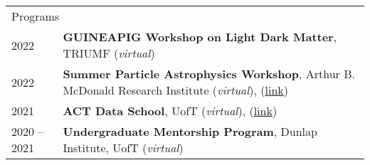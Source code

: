 \documentclass[10pt]{res} %
\begin{document}
\begin{resume}
\begin{table}[h]
\begin{tabularx}{\textwidth}{ @{} p{6.5em} X @{} }
\multicolumn{2}{l}{ \rule{0pt}{3ex} \large \hspace{-12pt} Programs \dotfill \rule[-1.2ex]{0pt}{0pt}} \\
2022 & \textbf{GUINEAPIG Workshop on Light Dark Matter}, TRIUMF (\textit{virtual}) \\
2022 & \textbf{Summer Particle Astrophysics Workshop}, Arthur B. McDonald Research Institute (\textit{virtual}), (\href{https://indico.cern.ch/event/1151180/registrations/participants}{link}) \\
2021 & \textbf{ACT Data School}, UofT (\textit{virtual}),  (\href{https://sites.google.com/view/actdataschool/participants}{link}) \\
2020 -- 2021 & \textbf{Undergraduate Mentorship Program}, Dunlap Institute, UofT (\textit{virtual}) \\


\end{tabularx}
\end{table}
\end{resume}
\end{document}
